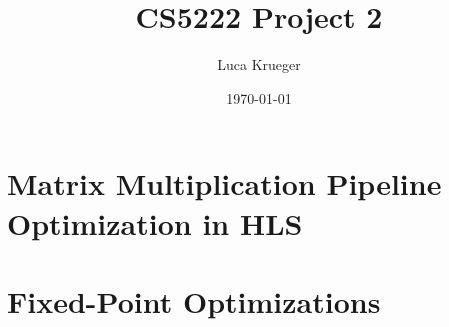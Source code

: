 \documentclass{article}
\title{CS5222 Project 2}
\author{Luca Krueger}
\date{\today}
\begin{document}
\maketitle

\section{Matrix Multiplication Pipeline Optimization in HLS}


\newpage
\section{Fixed-Point Optimizations}

\end{document}
